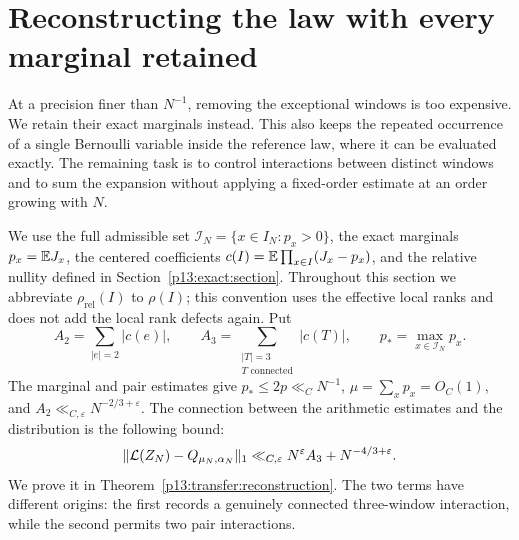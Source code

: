 \section{Reconstructing the law with every marginal retained}
\label{p13:transfer:section}

At a precision finer than $N^{-1}$, removing the exceptional windows is
too expensive. We retain their exact marginals instead. This also keeps
the repeated occurrence of a single Bernoulli variable inside the
reference law, where it can be evaluated exactly. The remaining task is
to control interactions between distinct windows and to sum the expansion
without applying a fixed-order estimate at an order growing with $N$.

We use the full admissible set $\mathcal I_N=\{x\in I_N:p_x>0\}$,
the exact marginals $p_x=\mathbb E J_x$, the centered coefficients
$c(I)=\mathbb E\prod_{x\in I}(J_x-p_x)$, and the relative nullity defined in
Section~\ref{p13:exact:section}. Throughout this section we abbreviate
$\rho_{\mathrm{rel}}(I)$ to $\rho(I)$; this convention uses the effective
local ranks and does not add the local rank defects again. Put
\[
 A_2=\sum_{|e|=2}|c(e)|,\qquad
 A_3=\sum_{\substack{|T|=3\\T\text{ connected}}}|c(T)|,
 \qquad p_* =\max_{x\in\mathcal I_N}p_x.
\]
The marginal and pair estimates give
$p_*\leq2p\ll_C N^{-1}$, $\mu=\sum_xp_x=O_C(1)$, and
$A_2\ll_{C,\varepsilon}N^{-2/3+\varepsilon}$.
The connection between the arithmetic estimates and the distribution is
the following bound:
\begin{equation}
 \|\mathcal L(Z_N)-Q_{\mu_N,\alpha_N}\|_1
 \ll_{C,\varepsilon}N^\varepsilon A_3+N^{-4/3+\varepsilon}.
 \label{p13:transfer:announced-bound}
\end{equation}
We prove it in Theorem~\ref{p13:transfer:reconstruction}. The two terms
have different origins: the first records a genuinely connected
three-window interaction, while the second permits two pair interactions.

